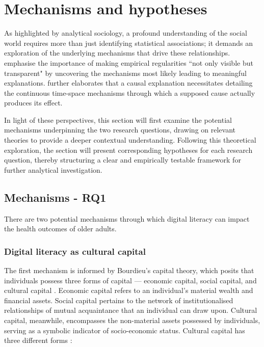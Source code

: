 \chapter{\label{ch:3-hypothesis}Mechanisms and hypotheses}

As highlighted by analytical sociology, a profound understanding of the social world requires more than just identifying statistical associations; it demands an exploration of the underlying mechanisms that drive these relationships. \textcite[p. 5]{hedstrom_what_2011} emphasise the importance of making empirical regularities ``not only visible but transparent" by uncovering the mechanisms most likely leading to meaningful explanations. \textcite[p. 112]{goldthorpe_sociology_2016} further elaborates that a causal explanation necessitates detailing the continuous time-space mechanisms through which a supposed cause actually produces its effect. 

In light of these perspectives, this section will first examine the potential mechanisms underpinning the two research questions, drawing on relevant theories to provide a deeper contextual understanding. Following this theoretical exploration, the section will present corresponding hypotheses for each research question, thereby structuring a clear and empirically testable framework for further analytical investigation.

\section{Mechanisms - RQ1}
There are two potential mechanisms through which digital literacy can impact the health outcomes of older adults. 

\subsection{Digital literacy as cultural capital}
The first mechanism is informed by Bourdieu's capital theory, which posits that individuals possess three forms of capital — economic capital, social capital, and cultural capital \parencite{bourdieu_forms_1986}. Economic capital refers to an individual's material wealth and financial assets. Social capital pertains to the network of institutionalised relationships of mutual acquaintance that an individual can draw upon. Cultural capital, meanwhile, encompasses the non-material assets possessed by individuals, serving as a symbolic indicator of socio-economic status. Cultural capital has three different forms \parencite{xu_individual_2020}:

